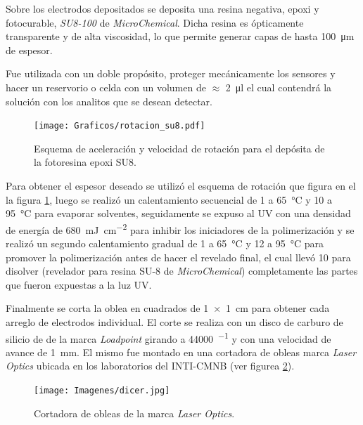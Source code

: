 		Sobre los electrodos depositados se deposita una resina negativa, epoxi y fotocurable, \textit{SU8-100} de \textit{MicroChemical}\cite{MicrochemicalsTeam2009}. Dicha resina es ópticamente transparente y de alta viscosidad, lo que permite generar capas de hasta \SI{100}{\um} de espesor. 

		Fue utilizada con un doble propósito, proteger mecánicamente los sensores y hacer un reservorio o celda con un volumen de $\approx$ \SI{2}{\ul} el cual contendrá la solución con los analitos que se desean detectar.  
			\begin{figure}[ht]
			 		  \begin{center}
			 		  \texttt{[image: Graficos/rotacion\_su8.pdf]}
			 		  \caption[Parámetros de depósito para la resina epoxi]{Esquema de aceleración y velocidad de rotación para el depósita de la fotoresina epoxi SU8.}
			 		  \label{fig:spin-su8}
			 		  \end{center}
			 		  \end{figure}
	
		Para obtener el espesor deseado se utilizó el esquema de rotación que figura en el la figura \ref{fig:spin-su8}, luego se realizó un calentamiento secuencial de \SI{1}{\min} a \SI{65}{\celsius} y \SI{10}{\min} a \SI{95}{\celsius} para evaporar solventes, seguidamente se expuso al UV con una densidad de energía de \SI{680}{mJ.cm^{-2}} para inhibir los iniciadores de la polimerización y se realizó un segundo calentamiento gradual de \SI{1}{\min} a \SI{65}{\celsius} y \SI{12}{\min} a \SI{95}{\celsius} para promover la polimerización antes de hacer el revelado final, el cual llevó \SI{10}{\min} para disolver (revelador para resina SU-8 de \textit{MicroChemical}) completamente las partes que fueron expuestas a la luz UV. 
		
		Finalmente se corta la oblea en cuadrados de \SI{1x1}{\cm} para obtener cada arreglo de electrodos individual. El corte se realiza con un disco de carburo de silicio de  de la marca \textit{Loadpoint} girando a \SI{44000}{\min^{-1}} y con una velocidad de avance de \SI{1}{\mm}. El mismo fue montado en una cortadora de obleas marca \textit{Laser Optics} ubicada en los laboratorios del INTI-CMNB (ver figurea \ref{fig:dicer}).
			\begin{figure}[ht]
			 		  \begin{center}
			 		  \texttt{[image: Imagenes/dicer.jpg]}
			 		  \caption[Cortadora de obleas]{Cortadora de obleas de la marca \textit{Laser Optics}.}
			 		  \label{fig:dicer}
			 		  \end{center}
			 		  \end{figure}

